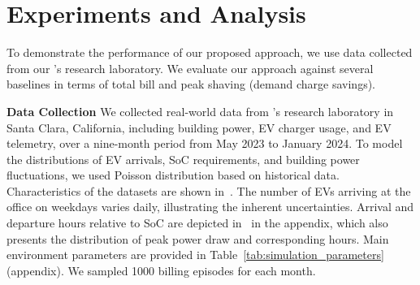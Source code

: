 \section{Experiments and Analysis}
\label{sec:experiments_and_results}
To demonstrate the performance of our proposed approach, we use data collected from our \nissan{}'s research laboratory. We evaluate our approach against several baselines in terms of total bill and peak shaving (demand charge savings).


% 
% 
% 

\noindent \textbf{Data Collection}
We collected real-world data from \nissan{}'s research laboratory in Santa Clara, California, including building power, EV charger usage, and EV telemetry, over a nine-month period from May 2023 to January 2024. To model the distributions of EV arrivals, SoC requirements, and building power fluctuations, we used Poisson distribution based on historical data. Characteristics of the datasets are shown in~.
{\color{black} The number of EVs arriving at the office on weekdays varies daily, illustrating the inherent uncertainties. Arrival and departure hours relative to SoC are depicted in~ in the appendix, which also presents the distribution of peak power draw and corresponding hours. Main environment parameters are provided in Table~\ref{tab:simulation_parameters} (appendix).} We sampled 1000 billing episodes for each month. 

